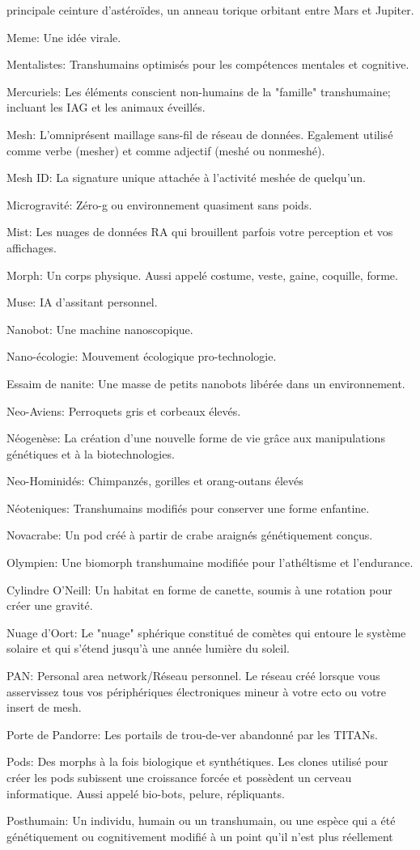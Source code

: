 principale ceinture d'astéroïdes, un anneau torique orbitant entre Mars et Jupiter. \item Meme: Une idée virale. \item Mentalistes: Transhumains optimisés pour les compétences mentales et cognitive. \item Mercuriels: Les éléments conscient non-humains de la "famille" transhumaine; incluant les IAG et les animaux éveillés. \item Mesh: L'omniprésent maillage sans-fil de réseau de données. Egalement utilisé comme verbe (mesher) et comme adjectif (meshé ou nonmeshé). \item Mesh ID: La signature unique attachée à l'activité meshée de quelqu'un. \item Microgravité: Zéro-g ou environnement quasiment sans poids. \item Mist: Les nuages de données RA qui brouillent parfois votre perception et vos affichages. \item Morph: Un corps physique. Aussi appelé costume, veste, gaine, coquille, forme. \item Muse: IA d'assitant personnel. \item Nanobot: Une machine nanoscopique. \item Nano-écologie: Mouvement écologique pro-technologie. \item Essaim de nanite: Une masse de petits nanobots libérée dans un environnement. \item Neo-Aviens: Perroquets gris et corbeaux élevés. \item Néogenèse: La création d'une nouvelle forme de vie grâce aux manipulations génétiques et à la biotechnologies. \item Neo-Hominidés: Chimpanzés, gorilles et orang-outans élevés \item Néoteniques: Transhumains modifiés pour conserver une forme enfantine. \item Novacrabe: Un pod créé à partir de crabe araignés génétiquement conçus. \item Olympien: Une biomorph transhumaine modifiée pour l'athéltisme et l'endurance. \item Cylindre O'Neill: Un habitat en forme de canette, soumis à une rotation pour créer une gravité. \item Nuage d'Oort: Le "nuage" sphérique constitué de comètes qui entoure le système solaire et qui s'étend jusqu'à une année lumière du soleil. \item PAN: Personal area network/Réseau personnel. Le réseau créé lorsque vous asservissez tous vos périphériques électroniques mineur à votre ecto ou votre insert de mesh. \item Porte de Pandorre: Les portails de trou-de-ver abandonné par les TITANs. \item Pods: Des morphs à la fois biologique et synthétiques. Les clones utilisé pour créer les pods subissent une croissance forcée et possèdent un cerveau informatique. Aussi appelé bio-bots, pelure, répliquants. \item Posthumain: Un individu, humain ou un transhumain, ou une espèce qui a été génétiquement ou cognitivement modifié à un point qu'il n'est plus réellement 